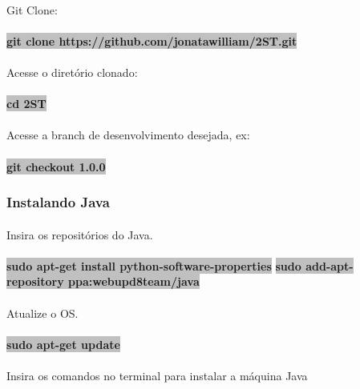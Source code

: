 \documentclass[	DIV=calc,%
							paper=a4,%
							fontsize=12pt,%
							onecolumn]{scrartcl}	 					%
\begin{document}
\paragraph{}
Git Clone:
\paragraph{}
\textbf{\colorbox{Silver}{git clone https://github.com/jonatawilliam/2ST.git}}
\paragraph{}
Acesse o diretório clonado:
\paragraph{}
\textbf{\colorbox{Silver}{cd 2ST}}
\paragraph{}
Acesse a branch de desenvolvimento desejada, ex:
\paragraph{}
\textbf{\colorbox{Silver}{git checkout 1.0.0}}

\subsubsection{Instalando Java}
\paragraph{}
Insira os repositórios do Java.
\paragraph{}
\textbf{\colorbox{Silver}{sudo apt-get install python-software-properties}}
\textbf{\colorbox{Silver}{sudo add-apt-repository ppa:webupd8team/java}}
\paragraph{}
Atualize o OS.
\paragraph{}
\textbf{\colorbox{Silver}{sudo apt-get update}}
\paragraph{}
Insira os comandos no terminal para instalar a máquina Java
\end{document}
